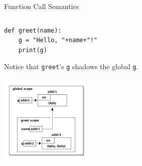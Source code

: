 \documentclass[smaller, aspectratio=1610]{beamer}
\begin{document}
\begin{frame}[label={sec:org0bf1cf7},fragile]{Function Call Semantics}
\begin{columns}
\begin{column}{0.3\columnwidth}
\begin{block}{}
\lstset{language=Python,label= ,caption= ,captionpos=b,numbers=none,basicstyle=\ttfamily\scriptsize, numbers=left}
\begin{lstlisting}
def greet(name):
    g = "Hello, "+name+"!"
    print(g)
\end{lstlisting}

Notice that \texttt{greet}'s \texttt{g} shadows the global \texttt{g}.
\begin{center}
\includegraphics[width=1.75in]{diagrams/greet-scope.png}
\end{center}
\end{block}
\end{column}
\end{columns}
\end{frame}
\end{document}
